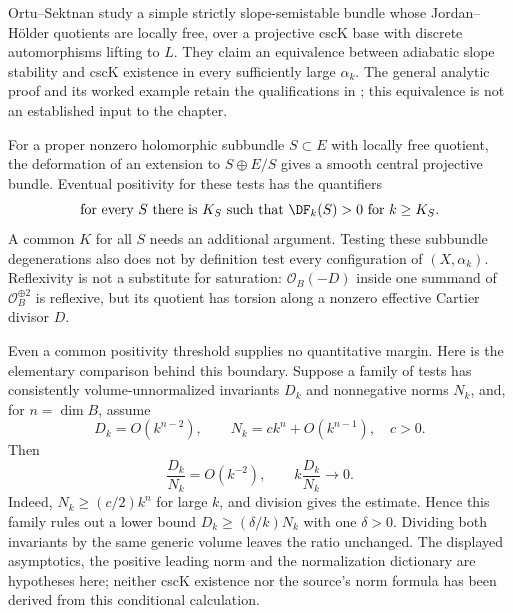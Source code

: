 Ortu--Sektnan \cite[Theorem~1.1]{OrtuSektnan24AdiabaticV2}
study a simple strictly slope-semistable bundle whose
Jordan--H\"older quotients are locally free, over a projective
cscK base with discrete automorphisms lifting to $L$. They claim
an equivalence between adiabatic slope stability and cscK
existence in every sufficiently large $\alpha_k$. The general
analytic proof and its worked example retain the qualifications
in ; this equivalence
is not an established input to the chapter.

For a proper nonzero holomorphic subbundle $S\subset E$ with
locally free quotient, the deformation of an extension to
$S\oplus E/S$ gives a smooth central projective bundle.
Eventual positivity for these tests has the quantifiers
\[
 \text{for every }S\text{ there is }K_S
 \text{ such that }\DF_k(S)>0\text{ for }k\geq K_S.
\]
A common $K$ for all $S$ needs an additional argument. Testing
these subbundle degenerations also does not by definition test
every configuration of $(X,\alpha_k)$. Reflexivity is not a
substitute for saturation: $\mathcal O_B(-D)$ inside one
summand of $\mathcal O_B^{\oplus2}$ is reflexive, but its quotient
has torsion along a nonzero effective Cartier divisor $D$.

Even a common positivity threshold supplies no quantitative
margin. Here is the elementary comparison behind this boundary.
Suppose a family of tests has consistently volume-unnormalized
invariants $D_k$ and nonnegative norms $N_k$, and, for
$n=\dim B$, assume
\[
 D_k=O(k^{n-2}),\qquad
 N_k=c k^n+O(k^{n-1}),\quad c>0.
\]
Then
\[
 \frac{D_k}{N_k}=O(k^{-2}),\qquad
 k\frac{D_k}{N_k}\longrightarrow0.
 \tag{62.14e}\label{eq:mpwn-adiabatic-ratio-boundary}
\]
Indeed, $N_k\geq(c/2)k^n$ for large $k$, and division gives
the estimate. Hence this family rules out a lower bound
$D_k\geq(\delta/k)N_k$ with one $\delta>0$. Dividing both
invariants by the same generic volume leaves the ratio
unchanged. The displayed asymptotics, the positive leading norm
and the normalization dictionary are hypotheses here; neither
cscK existence nor the source's norm formula has been derived
from this conditional calculation.

